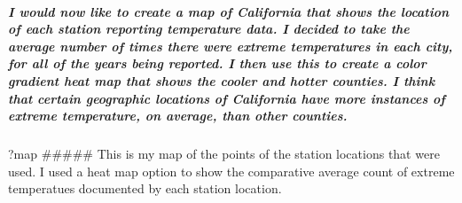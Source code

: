 \documentclass[]{article}
\newenvironment{Shaded}{\begin{snugshade}}{\end{snugshade}}
\newcommand{\KeywordTok}[1]{\textcolor[rgb]{0.13,0.29,0.53}{\textbf{#1}}}
\newcommand{\NormalTok}[1]{#1}
\newcommand{\OperatorTok}[1]{\textcolor[rgb]{0.81,0.36,0.00}{\textbf{#1}}}
\newcommand{\StringTok}[1]{\textcolor[rgb]{0.31,0.60,0.02}{#1}}
\let\oldsubparagraph\subparagraph
\renewcommand{\subparagraph}[1]{\oldsubparagraph{#1}\mbox{}}
\begin{document}
\hypertarget{i-would-now-like-to-create-a-map-of-california-that-shows-the-location-of-each-station-reporting-temperature-data.-i-decided-to-take-the-average-number-of-times-there-were-extreme-temperatures-in-each-city-for-all-of-the-years-being-reported.-i-then-use-this-to-create-a-color-gradient-heat-map-that-shows-the-cooler-and-hotter-counties.-i-think-that-certain-geographic-locations-of-california-have-more-instances-of-extreme-temperature-on-average-than-other-counties.}{%
\subparagraph{I would now like to create a map of California that shows
the location of each station reporting temperature data. I decided to
take the average number of times there were extreme temperatures in each
city, for all of the years being reported. I then use this to create a
color gradient heat map that shows the cooler and hotter counties. I
think that certain geographic locations of California have more
instances of extreme temperature, on average, than other
counties.}\label{i-would-now-like-to-create-a-map-of-california-that-shows-the-location-of-each-station-reporting-temperature-data.-i-decided-to-take-the-average-number-of-times-there-were-extreme-temperatures-in-each-city-for-all-of-the-years-being-reported.-i-then-use-this-to-create-a-color-gradient-heat-map-that-shows-the-cooler-and-hotter-counties.-i-think-that-certain-geographic-locations-of-california-have-more-instances-of-extreme-temperature-on-average-than-other-counties.}}

\begin{Shaded}
\end{Shaded}

?map \#\#\#\#\# This is my map of the points of the station locations
that were used. I used a heat map option to show the comparative average
count of extreme temperatues documented by each station location.
\end{document}
